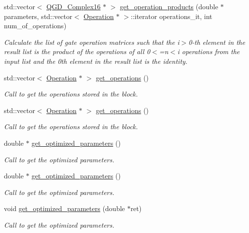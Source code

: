 \begin{DoxyCompactItemize}
std\+::vector$<$ \hyperlink{struct_q_g_d___complex16}{Q\+G\+D\+\_\+\+Complex16} $\ast$ $>$ \hyperlink{class_decomposition___base_a7f3fd202c32e65cbc312ec61d426442a}{get\+\_\+operation\+\_\+products} (double $\ast$parameters, std\+::vector$<$ \hyperlink{class_operation}{Operation} $\ast$ $>$\+::iterator operations\+\_\+it, int num\+\_\+of\+\_\+operations)
\begin{DoxyCompactList}\small\item\em Calculate the list of gate operation matrices such that the i$>$0-\/th element in the result list is the product of the operations of all 0$<$=n$<$i operations from the input list and the 0th element in the result list is the identity. \end{DoxyCompactList}\item 
std\+::vector$<$ \hyperlink{class_operation}{Operation} $\ast$ $>$ \hyperlink{class_operation__block_a489d0c5758732ca49d5f5aca225e9318}{get\+\_\+operations} ()
\begin{DoxyCompactList}\small\item\em Call to get the operations stored in the block. \end{DoxyCompactList}\item 
std\+::vector$<$ \hyperlink{class_operation}{Operation} $\ast$ $>$ \hyperlink{class_operation__block_aecb9b674dfd43456605a6c13dfba3afb}{get\+\_\+operations} ()
\begin{DoxyCompactList}\small\item\em Call to get the operations stored in the block. \end{DoxyCompactList}\item 
double $\ast$ \hyperlink{class_decomposition___base_a27c8d07322621ccd644aaff8af667809}{get\+\_\+optimized\+\_\+parameters} ()
\begin{DoxyCompactList}\small\item\em Call to get the optimized parameters. \end{DoxyCompactList}\item 
double $\ast$ \hyperlink{class_decomposition___base_ae2dd23fc79127ca9d25eafeb1137d094}{get\+\_\+optimized\+\_\+parameters} ()
\begin{DoxyCompactList}\small\item\em Call to get the optimized parameters. \end{DoxyCompactList}\item 
void \hyperlink{class_decomposition___base_ae9d74e7137a05ceda5d6efeba8cc6c8e}{get\+\_\+optimized\+\_\+parameters} (double $\ast$ret)
\begin{DoxyCompactList}\small\item\em Call to get the optimized parameters. \end{DoxyCompactList}\item 

\end{DoxyCompactItemize}
